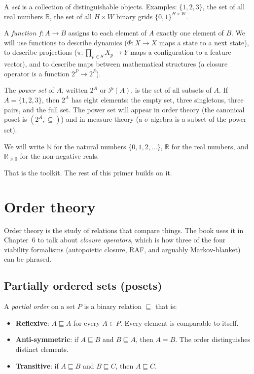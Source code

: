 A \emph{set} is a collection of distinguishable objects. Examples:
$\{1, 2, 3\}$, the set of all real numbers $\mathbb{R}$, the set of
all $H \times W$ binary grids $\{0,1\}^{H\times W}$.

A \emph{function} $f : A \to B$ assigns to each element of $A$
exactly one element of $B$. We will use functions to describe
dynamics ($\Phi : X \to X$ maps a state to a next state), to describe
projections ($\pi : \prod_{p \in S} X_p \to Y$ maps a configuration
to a feature vector), and to describe maps between mathematical
structures (a closure operator is a function $2^P \to 2^P$).

The \emph{power set} of $A$, written $2^A$ or $\mathcal{P}(A)$, is
the set of all subsets of $A$. If $A = \{1, 2, 3\}$, then $2^A$ has
eight elements: the empty set, three singletons, three pairs, and
the full set. The power set will appear in order theory (the
canonical poset is $(2^A, \subseteq)$) and in measure theory (a
$\sigma$-algebra is a subset of the power set).

We will write $\mathbb{N}$ for the natural numbers $\{0, 1, 2,
\ldots\}$, $\mathbb{R}$ for the real numbers, and $\mathbb{R}_{\geq
0}$ for the non-negative reals.

That is the toolkit. The rest of this primer builds on it.

\section{Order theory}

Order theory is the study of relations that compare things. The book
uses it in Chapter~6 to talk about \emph{closure operators}, which
is how three of the four viability formalisms (autopoietic closure,
RAF, and arguably Markov-blanket) can be phrased.

\subsection*{Partially ordered sets (posets)}

A \emph{partial order} on a set $P$ is a binary relation $\sqsubseteq$
that is:

\begin{itemize}[leftmargin=1.5em,itemsep=2pt]
  \item \textbf{Reflexive}: $A \sqsubseteq A$ for every $A \in P$.
    Every element is comparable to itself.
  \item \textbf{Anti-symmetric}: if $A \sqsubseteq B$ and $B
    \sqsubseteq A$, then $A = B$. The order distinguishes distinct
    elements.
  \item \textbf{Transitive}: if $A \sqsubseteq B$ and $B \sqsubseteq
    C$, then $A \sqsubseteq C$.
\end{itemize}

